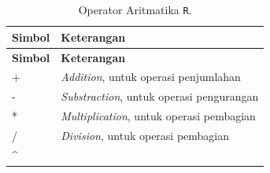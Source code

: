 \documentclass[]{book}
\begin{document}
\begin{longtable}[]{@{}ll@{}}
\caption{\label{tab:oparitmatika} Operator Aritmatika
\texttt{R}.}\tabularnewline
\toprule
\begin{minipage}[b]{0.15\columnwidth}\raggedright\strut
\textbf{Simbol}\strut
\end{minipage} & \begin{minipage}[b]{0.79\columnwidth}\raggedright\strut
\textbf{Keterangan}\strut
\end{minipage}\tabularnewline
\midrule
\endfirsthead
\toprule
\begin{minipage}[b]{0.15\columnwidth}\raggedright\strut
\textbf{Simbol}\strut
\end{minipage} & \begin{minipage}[b]{0.79\columnwidth}\raggedright\strut
\textbf{Keterangan}\strut
\end{minipage}\tabularnewline
\midrule
\endhead
\begin{minipage}[t]{0.15\columnwidth}\raggedright\strut
+\strut
\end{minipage} & \begin{minipage}[t]{0.79\columnwidth}\raggedright\strut
\emph{Addition}, untuk operasi penjumlahan\strut
\end{minipage}\tabularnewline
\begin{minipage}[t]{0.15\columnwidth}\raggedright\strut
-\strut
\end{minipage} & \begin{minipage}[t]{0.79\columnwidth}\raggedright\strut
\emph{Substraction}, untuk operasi pengurangan\strut
\end{minipage}\tabularnewline
\begin{minipage}[t]{0.15\columnwidth}\raggedright\strut
*\strut
\end{minipage} & \begin{minipage}[t]{0.79\columnwidth}\raggedright\strut
\emph{Multiplication}, untuk operasi pembagian\strut
\end{minipage}\tabularnewline
\begin{minipage}[t]{0.15\columnwidth}\raggedright\strut
/\strut
\end{minipage} & \begin{minipage}[t]{0.79\columnwidth}\raggedright\strut
\emph{Division}, untuk operasi pembagian\strut
\end{minipage}\tabularnewline
\begin{minipage}[t]{0.15\columnwidth}\raggedright\strut
\^{}\strut
\end{minipage} & \begin{minipage}[t]{0.79\columnwidth}\raggedright\strut

\end{minipage}
\end{longtable}
\end{document}
